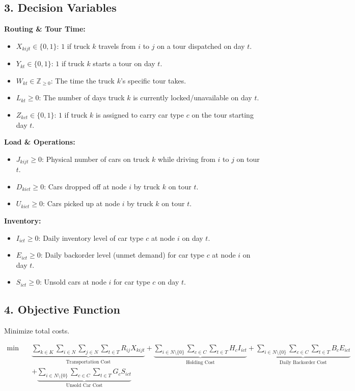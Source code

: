 \documentclass{article}
\begin{document}
\subsection*{3. Decision Variables}
\textbf{Routing \& Tour Time:}
\begin{itemize}
    \item $X_{kijt} \in \{0, 1\}$: $1$ if truck $k$ travels from $i$ to $j$ on a tour dispatched on day $t$.
    \item $Y_{kt} \in \{0, 1\}$: $1$ if truck $k$ starts a tour on day $t$.
    \item $W_{kt} \in \mathbb{Z}_{\ge 0}$: The time the truck $k$'s specific tour takes.
    \item $L_{kt} \ge 0$: The number of days truck $k$ is currently locked/unavailable on day $t$.
    \item $Z_{kct} \in \{0, 1\}$: $1$ if truck $k$ is assigned to carry car type $c$ on the tour starting day $t$.
\end{itemize}

\textbf{Load \& Operations:}
\begin{itemize}
    \item $J_{kijt} \ge 0$: Physical number of cars on truck $k$ while driving from $i$ to $j$ on tour $t$.
    \item $D_{kict} \ge 0$: Cars dropped off at node $i$ by truck $k$ on tour $t$.
    \item $U_{kict} \ge 0$: Cars picked up at node $i$ by truck $k$ on tour $t$.
\end{itemize}

\textbf{Inventory:}
\begin{itemize}
    \item $I_{ict} \ge 0$: Daily inventory level of car type $c$ at node $i$ on day $t$.
    \item $E_{ict} \ge 0$: Daily backorder level (unmet demand) for car type $c$ at node $i$ on day $t$.
    \item $S_{ict} \ge 0$: Unsold cars at node $i$ for car type $c$ on day $t$.
\end{itemize}

\subsection*{4. Objective Function}
Minimize total costs.

\begin{align}
\min \quad & \underbrace{\sum_{k \in K} \sum_{i \in N} \sum_{j \in N} \sum_{t \in T} R_{ij} X_{kijt}}_{\text{Transportation Cost}} + \underbrace{\sum_{i \in N \setminus \{0\}} \sum_{c \in C} \sum_{t \in T} H_c I_{ict}}_{\text{Holding Cost}} + \underbrace{\sum_{i \in N \setminus \{0\}} \sum_{c \in C} \sum_{t \in T} B_c E_{ict}}_{\text{Daily Backorder Cost}} \nonumber \\
& + \underbrace{\sum_{i \in N \setminus \{0\}} \sum_{c \in C} \sum_{t \in T} G_c S_{ict}}_{\text{Unsold Car Cost}}
\end{align}
\end{document}
